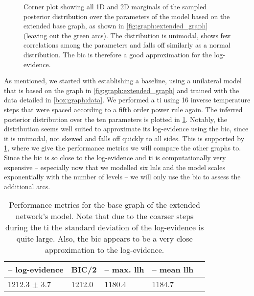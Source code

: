 \documentclass[\relativeRoot/main.tex]{subfiles}
\begin{document}
\begin{figure}
    \centering
    \def\svgwidth{1.04\textwidth}
    
    \caption[
        Corner plot of parameters for the extended base graph
    ]{
        Corner plot showing all 1D and 2D marginals of the sampled posterior distribution over the parameters of the model based on the extended base graph, as shown in \cref{fig:graph:extended_graph} (leaving out the green arcs). The distribution is unimodal, shows few correlations among the parameters and falls off similarly as a normal distribution. The \gls{bic} is therefore a good approximation for the log-evidence.
    }
    \label{fig:graph:extended:base:corner}
\end{figure}

As mentioned, we started with establishing a baseline, using a unilateral model that is based on the graph in \cref{fig:graph:extended_graph} and trained with the data detailed in \cref{box:graph:data}. We performed a \gls{ti} using 16 inverse temperature steps that were spaced according to a fifth order power rule again. The inferred posterior distribution over the ten parameters is plotted in \cref{fig:graph:extended:base:corner}. Notably, the distribution seems well suited to approximate its log-evidence using the \gls{bic}, since it is unimodal, not skewed and falls off quickly to all sides. This is supported by \cref{table:graph:extended:base}, where we give the performance metrics we will compare the other graphs to. Since the \gls{bic} is so close to the log-evidence and \gls{ti} is computationally very expensive -- especially now that we modelled six \glspl{lnl} and the model scales exponentially with the number of levels -- we will only use the \gls{bic} to assess the additional arcs.

\begin{table}
    \centering
    \begin{tabular}{|l|l|l|l|l|}
        \hline
        \textbf{-- log-evidence} & \textbf{BIC/2} & \textbf{-- max. llh} & \textbf{-- mean llh} \\
        \hline
        1212.3 $\pm$ 3.7 & 1212.0 & 1180.4 & 1184.7 \\ 
        \hline
    \end{tabular}
    \caption[
        Performance of the extended base graph
    ]{
        Performance metrics for the base graph of the extended network's model. Note that due to the coarser steps during the \acrlong{ti} the standard deviation of the log-evidence is quite large. Also, the \gls{bic} appears to be a very close approximation to the log-evidence.
    }
    \label{table:graph:extended:base}
\end{table}
\end{document}
